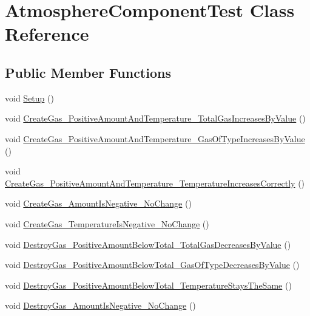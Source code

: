\hypertarget{class_atmosphere_component_test}{}\section{Atmosphere\+Component\+Test Class Reference}
\label{class_atmosphere_component_test}
\subsection*{Public Member Functions}
\begin{DoxyCompactItemize}
\item 
void \hyperlink{class_atmosphere_component_test_a745c5dbf88fe22c50ea654d23da0696b}{Setup} ()
\item 
void \hyperlink{class_atmosphere_component_test_acc9c745d592aa416c2d06cb30d4135bb}{Create\+Gas\+\_\+\+Positive\+Amount\+And\+Temperature\+\_\+\+Total\+Gas\+Increases\+By\+Value} ()
\item 
void \hyperlink{class_atmosphere_component_test_af5c6bdac9174dbab84740c38dbaed8f1}{Create\+Gas\+\_\+\+Positive\+Amount\+And\+Temperature\+\_\+\+Gas\+Of\+Type\+Increases\+By\+Value} ()
\item 
void \hyperlink{class_atmosphere_component_test_a5142b66c0a16246e81e388755138b0ea}{Create\+Gas\+\_\+\+Positive\+Amount\+And\+Temperature\+\_\+\+Temperature\+Increases\+Correctly} ()
\item 
void \hyperlink{class_atmosphere_component_test_a1224924dddbdf37f3b649942c98e9872}{Create\+Gas\+\_\+\+Amount\+Is\+Negative\+\_\+\+No\+Change} ()
\item 
void \hyperlink{class_atmosphere_component_test_ac704bb37f3495a5bb4250150a6a630ad}{Create\+Gas\+\_\+\+Temperature\+Is\+Negative\+\_\+\+No\+Change} ()
\item 
void \hyperlink{class_atmosphere_component_test_acdba37f553eb4c6470606ff8cf965160}{Destroy\+Gas\+\_\+\+Positive\+Amount\+Below\+Total\+\_\+\+Total\+Gas\+Decreases\+By\+Value} ()
\item 
void \hyperlink{class_atmosphere_component_test_a128a50923030442c8a6d22464fcd4eb8}{Destroy\+Gas\+\_\+\+Positive\+Amount\+Below\+Total\+\_\+\+Gas\+Of\+Type\+Decreases\+By\+Value} ()
\item 
void \hyperlink{class_atmosphere_component_test_a7f24f9ae60abfee24063039ff89b6fa1}{Destroy\+Gas\+\_\+\+Positive\+Amount\+Below\+Total\+\_\+\+Temperature\+Stays\+The\+Same} ()
\item 
void \hyperlink{class_atmosphere_component_test_ae581f7ef1dfbd257d36ad5be4cbfaf0a}{Destroy\+Gas\+\_\+\+Amount\+Is\+Negative\+\_\+\+No\+Change} ()

\end{DoxyCompactItemize}
